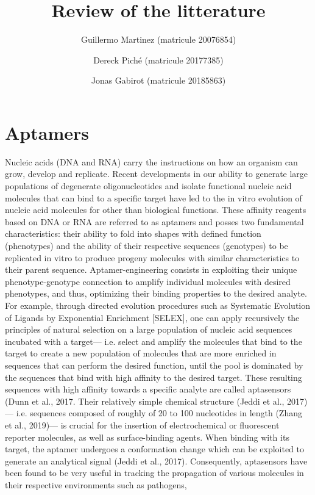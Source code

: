 \documentclass{article}
\title{Review of the litterature}
\author
{
    Guillermo Martinez (matricule 20076854)
    \and
    Dereck Piché (matricule 20177385)
    \and
    Jonas Gabirot (matricule 20185863)
}
\begin{document}
\maketitle

\section*{Aptamers}
Nucleic acids (DNA and RNA) carry the instructions on 
how an organism can grow, develop and replicate. Recent
 developments in our ability to generate large populations of 
 degenerate oligonucleotides and isolate functional nucleic acid 
 molecules that can bind to a specific target have led to the in 
 vitro evolution of nucleic acid molecules for other than biological functions. 
 These affinity reagents based on DNA or RNA are referred to as aptamers 
 and posses two fundamental characteristics: their ability to fold 
 into shapes with defined function (phenotypes) and the ability of 
 their respective sequences (genotypes) to be replicated in vitro to 
 produce progeny molecules with similar characteristics to their 
 parent sequence. Aptamer-engineering consists in exploiting their 
 unique phenotype-genotype connection to amplify individual molecules 
 with desired phenotypes, and thus, optimizing their binding properties 
 to the desired analyte.  For example, through directed evolution 
 procedures such as Systematic Evolution of Ligands by Exponential 
 Enrichment [SELEX], one can apply recursively the principles of 
 natural selection on a large population of nucleic acid sequences 
 incubated with a target— i.e. select and amplify the molecules 
 that bind to the target to create a new population of molecules 
 that are more enriched in sequences that can perform the desired 
 function, until the pool is dominated by the sequences that bind 
 with high affinity to the desired target. These resulting sequences 
 with high affinity towards a specific analyte are called aptasensors 
 (Dunn et al., 2017. Their relatively simple chemical structure 
 (Jeddi et al., 2017)— i.e. sequences composed of roughly of 20 to 
 100 nucleotides in length (Zhang et al., 2019)— is crucial for the 
 insertion of electrochemical or fluorescent reporter molecules, as 
 well as surface-binding agents. When binding with its target, the 
 aptamer undergoes a conformation change which can be exploited to 
 generate an analytical signal (Jeddi et al., 2017). Consequently, 
 aptasensors have been found to be very useful in tracking the propagation 
 of various molecules in their respective environments such as pathogens, 
\end{document}
